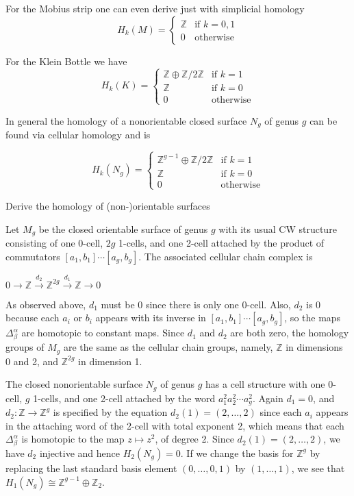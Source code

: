 For the Mobius strip one can even derive just with simplicial homology
\[ H_k(M) = 
\begin{cases} 
\mathbb{Z} & \text{if } k = 0,1 \\
0 & \text{otherwise}
\end{cases} \]

For the Klein Bottle we have
\[ H_k(K) = 
\begin{cases} 
\mathbb{Z} \oplus \mathbb{Z}/2\mathbb{Z} & \text{if } k = 1 \\
\mathbb{Z} & \text{if } k = 0 \\
0 & \text{otherwise}
\end{cases} \]

In general the homology of a nonorientable closed surface \( N_g \) of genus \( g \) can be found via cellular homology
and is

\[ H_k(N_g) = 
\begin{cases} 
\mathbb{Z}^{g-1} \oplus \mathbb{Z}/2\mathbb{Z} & \text{if } k = 1 \\
\mathbb{Z} & \text{if } k = 0 \\
0 & \text{otherwise}
\end{cases} \]



Derive the homology of (non-)orientable surfaces

Let \(M_g\) be the closed orientable surface of genus \(g\) with its usual CW structure consisting of one 0-cell, \(2g\) 1-cells, 
and one 2-cell attached by the product of commutators \([a_1, b_1] \dotsm [a_g, b_g]\). The associated cellular chain complex is

\(0 \longrightarrow \mathbb{Z} \xrightarrow{d_2} \mathbb{Z}^{2g} \xrightarrow{d_1} \mathbb{Z} \longrightarrow 0\)

As observed above, \(d_1\) must be 0 since there is only one 0-cell. 
Also, \(d_2\) is 0 because each \(a_i\) or \(b_i\) appears with its inverse in \([a_1, b_1] \dotsm [a_g, b_g]\), so the maps \(\Delta_{\beta}^\alpha\) are homotopic to constant maps. 
Since \(d_1\) and \(d_2\) are both zero, the homology groups of \(M_g\) are the same as the cellular chain groups, namely, 
\(\mathbb{Z}\) in dimensions 0 and 2, and \(\mathbb{Z}^{2g}\) in dimension 1.


The closed nonorientable surface \(N_g\) of genus \(g\) has a cell structure
with one 0-cell, \(g\) 1-cells, and one 2-cell attached by the word \(a_1^2 a_2^2 \dotsm a_g^2\). Again
\(d_1 = 0\), and \(d_2 : \mathbb{Z} \to \mathbb{Z}^g\) is specified by the equation \(d_2(1) = (2, \dotsc , 2)\) since each \(a_i\)
appears in the attaching word of the 2-cell with total exponent 2, which means that
each \(\Delta_{\beta}^\alpha\) is homotopic to the map \(z \mapsto z^2\), of degree 2. Since \(d_2(1) = (2, \dotsc , 2)\), we
have \(d_2\) injective and hence \(H_2(N_g) = 0\). If we change the basis for \(\mathbb{Z}^g\) by replacing
the last standard basis element \((0, \dotsc, 0, 1)\) by \((1, \dotsc , 1)\), we see that \(H_1(N_g) \cong 
\mathbb{Z}^{g-1} \oplus \mathbb{Z}_2\).


